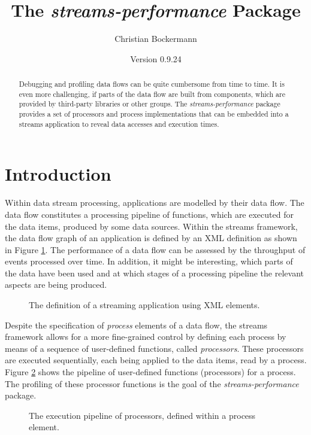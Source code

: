 \documentclass[german,a4]{scrartcl}
\title{The {\em streams-performance} Package}
\author{Christian Bockermann}
\date{\normalsize Version 0.9.24}
\begin{document}
\maketitle
\begin{abstract}
Debugging and profiling data flows can be quite cumbersome from time to time. It is
even more challenging, if parts of the data flow are built from components, which are
provided by third-party libraries or other groups. The
{\em streams-performance} package provides a set of processors and process implementations
that can be embedded into a \textsf{streams} application to reveal data accesses and
execution times.
\end{abstract}

\section{Introduction}
Within data stream processing, applications are modelled by their data flow. The data
flow constitutes a processing pipeline of functions, which are executed for the data
items, produced by some data sources. Within the \textsf{streams} framework, the data
flow graph of an application is defined by an XML definition as shown in Figure \ref{fig:xml}.
The performance of a data flow can be assessed by the throughput of events processed
over time. In addition, it might be interesting, which parts of the data have been used
and at which stages of a processing pipeline the relevant aspects are being produced.

\begin{figure}[h!]
\centering

\caption{\label{fig:xml}The definition of a streaming application using XML elements.}
\end{figure}


Despite the specification of {\em process} elements of a data flow, the \textsf{streams}
framework allows for a more fine-grained control by defining each process by means of
a sequence of user-defined functions, called {\em processors}. These processors are
executed sequentially, each being applied to the data items, read by a process. Figure
\ref{fig:pipeline} shows the pipeline of user-defined functions (processors) for a process.
The profiling of these processor functions is the goal of the {\em streams-performance}
package.

\begin{figure}[h!]
\centering
\begin{tikzpicture}[scale=0.75,transform shape]

\end{tikzpicture}
\caption{\label{fig:pipeline}The execution pipeline of processors, defined within a process element.}
\end{figure}
\end{document}
